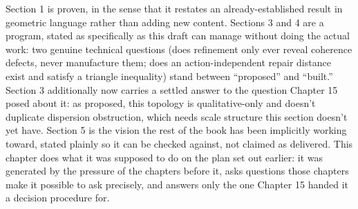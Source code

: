 Section 1 is proven, in the sense that it restates an already-established
result in geometric language rather than adding new content. Sections 3
and 4 are a program, stated as specifically as this draft can manage
without doing the actual work: two genuine technical questions (does
refinement only ever reveal coherence defects, never manufacture them;
does an action-independent repair distance exist and satisfy a triangle
inequality) stand between ``proposed'' and ``built.'' Section 3 additionally
now carries a settled answer to the question Chapter 15 posed about it:
as proposed, this topology is qualitative-only and doesn't duplicate
dispersion obstruction, which needs scale structure this section doesn't
yet have. Section 5 is the vision the rest of the book has been
implicitly working toward, stated plainly so it can be checked against,
not claimed as delivered. This chapter does what it was supposed to do
on the plan set out earlier: it was generated by the pressure of the
chapters before it, asks questions those chapters make it possible to
ask precisely, and answers only the one Chapter 15 handed it a decision
procedure for.
